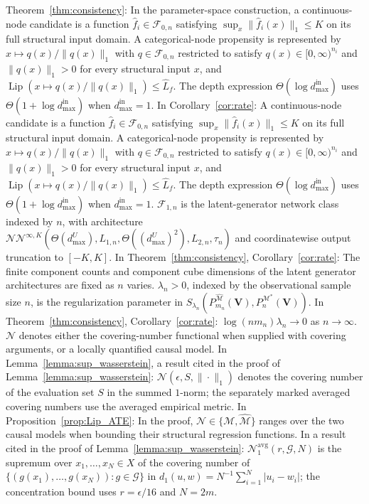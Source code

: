 \documentclass[12pt]{article}
\theoremstyle{plain}
\theoremstyle{definition}
\theoremstyle{remark}
\begin{document}
Theorem~\ref{thm:consistency}: In the parameter-space construction, a continuous-node candidate is a function $\hat f_i\in\mathcal{F}_{0,n}$ satisfying $\sup_x\|\hat f_i(x)\|_1\leqslant K$ on its full structural input domain. A categorical-node propensity is represented by $x\mapsto q(x)/\|q(x)\|_1$ with $q\in\mathcal{F}_{0,n}$ restricted to satisfy $q(x)\in[0,\infty)^{n_i}$ and $\|q(x)\|_1>0$ for every structural input $x$, and $\operatorname{Lip}(x\mapsto q(x)/\|q(x)\|_1)\leqslant\hat L_f$. The depth expression $\Theta(\log d_{\max}^{\text{in}})$ uses $\Theta(1+\log d_{\max}^{\text{in}})$ when $d_{\max}^{\text{in}}=1$. In Corollary~\ref{cor:rate}: A continuous-node candidate is a function $\hat f_i\in\mathcal{F}_{0,n}$ satisfying $\sup_x\|\hat f_i(x)\|_1\leqslant K$ on its full structural input domain. A categorical-node propensity is represented by $x\mapsto q(x)/\|q(x)\|_1$ with $q\in\mathcal{F}_{0,n}$ restricted to satisfy $q(x)\in[0,\infty)^{n_i}$ and $\|q(x)\|_1>0$ for every structural input $x$, and $\operatorname{Lip}(x\mapsto q(x)/\|q(x)\|_1)\leqslant\hat L_f$. The depth expression $\Theta(\log d_{\max}^{\text{in}})$ uses $\Theta(1+\log d_{\max}^{\text{in}})$ when $d_{\max}^{\text{in}}=1$. $\mathcal{F}_{1,n}$ is the latent-generator network class indexed by $n$, with architecture $\mathcal{NN}^{\infty,K}(\Theta(d_{\max}^{U}),L_{1,n},\Theta((d_{\max}^{U})^2),L_{2,n},\tau_n)$ and coordinatewise output truncation to $[-K,K]$. In Theorem~\ref{thm:consistency}, Corollary~\ref{cor:rate}: The finite component counts and component cube dimensions of the latent generator architectures are fixed as $n$ varies. $\lambda_n>0$, indexed by the observational sample size $n$, is the regularization parameter in $S_{\lambda_n}(P_{m_n}^{\hat{\mathcal{M}}}(\boldsymbol{V}),P_n^{\mathcal{M}^*}(\boldsymbol{V}))$. In Theorem~\ref{thm:consistency}, Corollary~\ref{cor:rate}: $\log(nm_n)\lambda_n\rightarrow0$ as $n\rightarrow\infty$. $\mathcal{N}$ denotes either the covering-number functional when supplied with covering arguments, or a locally quantified causal model. In Lemma~\ref{lemma:sup_wasserstein}, a result cited in the proof of Lemma~\ref{lemma:sup_wasserstein}: $\mathcal{N}(\epsilon,S,\|\cdotp\|_1)$ denotes the covering number of the evaluation set $S$ in the summed $1$-norm; the separately marked averaged covering numbers use the averaged empirical metric. In Proposition~\ref{prop:Lip_ATE}: In the proof, $\mathcal{N}\in\{\mathcal{M},\hat{\mathcal{M}}\}$ ranges over the two causal models when bounding their structural regression functions. In a result cited in the proof of Lemma~\ref{lemma:sup_wasserstein}: $\mathcal{N}_1^{\mathrm{avg}}(r,\mathcal G,N)$ is the supremum over $x_1,\ldots,x_N\in X$ of the covering number of $\{(g(x_1),\ldots,g(x_N)):g\in\mathcal G\}$ in $d_1(u,w)=N^{-1}\sum_{i=1}^N|u_i-w_i|$; the concentration bound uses $r=\epsilon/16$ and $N=2m$.
\end{document}
